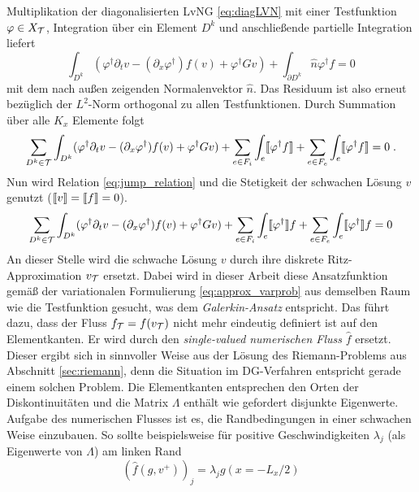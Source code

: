 Multiplikation der diagonalisierten LvNG \eqref{eq:diagLVN} mit einer Testfunktion $\varphi\in X_{\mathcal{T}}$, Integration über ein Element $D^k$ und anschließende partielle Integration liefert
\begin{equation*}
  \int_{D^k} (\varphi^{\dagger} \partial_t v - (\partial_x \varphi^{\dagger}) f(v) + \varphi^{\dagger} G v) + \int_{\partial D^k}\hat{n}\varphi^{\dagger}f = 0
\end{equation*}
mit dem nach außen zeigenden Normalenvektor $\hat{n}$. Das Residuum ist also erneut bezüglich der $L^2$-Norm orthogonal zu allen Testfunktionen. Durch Summation über alle $K_x$ Elemente folgt
\begin{equation*}
  \sum_{D^k\in\mathcal{T}}\int_{D^k} (\varphi^{\dagger} \partial_t v - (\partial_x \varphi^{\dagger}) f(v) + \varphi^{\dagger} G v)
  + \sum_{e\in F_i}\int_{e}\llbracket \varphi^{\dagger}f \rrbracket + \sum_{e\in F_e}\int_e \llbracket \varphi^{\dagger}f \rrbracket  = 0 \; .
\end{equation*}
Nun wird Relation \eqref{eq:jump_relation} und die Stetigkeit der schwachen Lösung $v$ genutzt (${\llbracket v \rrbracket=\llbracket f \rrbracket=0}$).
\begin{equation}
  \sum_{D^k\in\mathcal{T}}\int_{D^k} (\varphi^{\dagger} \partial_t v - (\partial_x \varphi^{\dagger}) f(v) + \varphi^{\dagger} G v)
  + \sum_{e\in F_i}\int_{e}\llbracket \varphi^{\dagger} \rrbracket f + \sum_{e\in F_e}\int_e \llbracket \varphi^{\dagger} \rrbracket f  = 0
  \label{eq:kontinForm}
\end{equation}
An dieser Stelle wird die schwache Lösung $v$ durch ihre diskrete Ritz-Approximation $v_{\mathcal{T}}$ ersetzt. Dabei wird in dieser Arbeit diese Ansatzfunktion gemäß der variationalen Formulierung \eqref{eq:approx_varprob} aus demselben Raum wie die Testfunktion gesucht, was dem \emph{Galerkin-Ansatz} entspricht. Das führt dazu, dass der Fluss $f_{\mathcal{T}} = f(v_{\mathcal{T}})$ nicht mehr eindeutig definiert ist auf den Elementkanten. Er wird durch den \emph{single-valued} \emph{numerischen Fluss} $\hat{f}$ ersetzt. Dieser ergibt sich in sinnvoller Weise aus der Lösung des Riemann-Problems aus Abschnitt \ref{sec:riemann}, denn die Situation im DG-Verfahren entspricht gerade einem solchen Problem. Die Elementkanten entsprechen den Orten der Diskontinuitäten und die Matrix $\Lambda$ enthält wie gefordert disjunkte Eigenwerte.
Aufgabe des numerischen Flusses ist es, die Randbedingungen in einer schwachen Weise einzubauen. So sollte beispielsweise für positive Geschwindigkeiten $\lambda_j$ (als Eigenwerte von $\Lambda$) am linken Rand
\begin{equation*}
  (\hat{f}(g, v^+))_j = \lambda_j g(x=-L_x/2)
\end{equation*}
